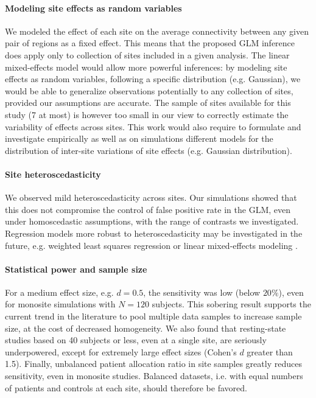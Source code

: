 \documentclass[authoryear]{elsarticle}
\begin{document}
\paragraph{Modeling site effects as random variables} We modeled the effect of each site on the average connectivity between any given pair of regions as a fixed effect. This means that the proposed GLM inference does apply only to collection of sites included in a given analysis. The linear mixed-effects model \citep{Chen2013} would allow more powerful inferences: by modeling site effects as random variables, following a specific distribution (e.g. Gaussian), we would be able to generalize observations potentially  to any collection of sites, provided our assumptions are accurate. The sample of sites available for this study (7 at most) is however too small in our view to correctly estimate the variability of effects across sites. This work would also require to formulate and investigate empirically as well as on simulations different models for the distribution of inter-site variations of site effects (e.g. Gaussian distribution).

\paragraph{Site heteroscedasticity} We observed mild heteroscedasticity across sites. Our simulations showed that this does not compromise the control of false positive rate in the GLM, even under homoscedastic assumptions, with the range of contrasts we investigated. Regression models more robust to heteroscedasticity may be investigated in the future, e.g. weighted least squares regression or linear mixed-effects modeling \citep{Chen2013}.

\paragraph{Statistical power and sample size} For a medium effect size, e.g. $d=0.5$, the sensitivity was low (below $20\%$), even for monosite simulations with $N=120$ subjects. This sobering result supports the current trend in the literature to pool multiple data samples to increase sample size, at the cost of decreased homogeneity. We also found that resting-state studies based on 40 subjects or less, even at a single site, are seriously underpowered, except for extremely large effect sizes (Cohen's $d$ greater than 1.5). Finally, unbalanced patient allocation ratio in site samples greatly reduces sensitivity, even in monosite studies. Balanced datasets, i.e. with equal numbers of patients and controls at each site, should therefore be favored. 
\end{document}
